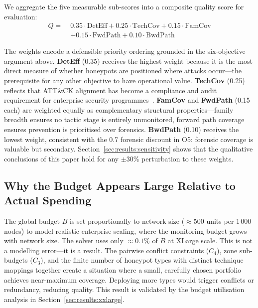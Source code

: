 \documentclass[journal]{IEEEtran}
\begin{document}
We aggregate the five measurable sub-scores into a composite
quality score for evaluation:
\begin{equation}
\begin{split}
  Q =\; &0.35\cdot\mathrm{DetEff} + 0.25\cdot\mathrm{TechCov}
          + 0.15\cdot\mathrm{FamCov} \\
        &+ 0.15\cdot\mathrm{FwdPath} + 0.10\cdot\mathrm{BwdPath}
\end{split}
  \label{eq:qscore}
\end{equation}

The weights encode a defensible priority ordering grounded in
the six-objective argument above. \textbf{DetEff} (0.35) receives
the highest weight because it is the most direct measure of whether
honeypots are positioned where attacks occur---the prerequisite for
any other objective to have operational value. \textbf{TechCov}
(0.25) reflects that ATT\&CK alignment has become a compliance and
audit requirement for enterprise security programmes~\cite{mitre2023}.
\textbf{FamCov} and \textbf{FwdPath} (0.15 each) are weighted
equally as complementary structural properties---family breadth
ensures no tactic stage is entirely unmonitored, forward path coverage
ensures prevention is prioritised over forensics. \textbf{BwdPath}
(0.10) receives the lowest weight, consistent with the $0.7$
forensic discount in O5: forensic coverage is valuable but
secondary. Section~\ref{sec:results:sensitivity} shows that the
qualitative conclusions of this paper hold for any $\pm30\%$
perturbation to these weights.

\subsection{Why the Budget Appears Large Relative to Actual Spending}
\label{sec:model:budget}

The global budget $B$ is set proportionally to network size
($\approx500$ units per 1\,000 nodes) to model realistic enterprise
scaling, where the monitoring budget grows with network size. The
solver uses only $\approx0.1\%$ of $B$ at XLarge scale. This is
not a modelling error---it is a result. The pairwise conflict
constraints ($C_4$), zone sub-budgets ($C_3$), and the finite
number of honeypot types with distinct technique mappings together
create a situation where a small, carefully chosen portfolio achieves
near-maximum coverage. Deploying more types would trigger conflicts
or redundancy, reducing quality. This result is validated by the
budget utilisation analysis in Section~\ref{sec:results:xxlarge}.
\end{document}
